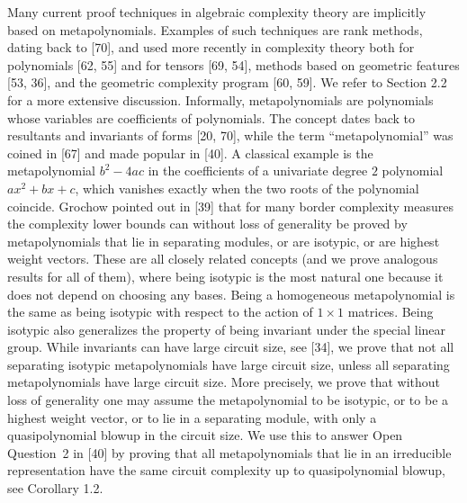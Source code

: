 Many current proof techniques in algebraic complexity theory are implicitly based on metapolynomials. Examples of such techniques are rank methods, dating back to [70], and used more recently in complexity theory both for polynomials [62, 55] and for tensors [69, 54], methods based on geometric features [53, 36], and the geometric complexity program [60, 59]. We refer to Section 2.2 for a more extensive discussion. Informally, metapolynomials are polynomials whose variables are coefficients of polynomials. The concept dates back to resultants and invariants of forms [20, 70], while the term “metapolynomial” was coined in [67] and made popular in [40]. A classical example is the metapolynomial $b^{2}-4ac$ in the coefficients of a univariate degree $2$ polynomial $ax^{2}+bx+c$, which vanishes exactly when the two roots of the polynomial coincide.
Grochow pointed out in [39] that for many border complexity measures the complexity lower bounds can without loss of generality be proved by metapolynomials that lie in separating modules, or are isotypic, or are highest weight vectors.
These are all closely related concepts (and we prove analogous results for all of them), where being isotypic is the most natural one because it does not depend on choosing any bases.
Being a homogeneous metapolynomial is the same as being isotypic with respect to the action of $1\times 1$ matrices.
Being isotypic also generalizes the property of being invariant under the special linear group.
While invariants can have large circuit size, see [34],
we prove that not all separating isotypic metapolynomials have large circuit size, unless all separating metapolynomials have large circuit size.
More precisely, we prove that without loss of generality one may assume the metapolynomial to be isotypic, or to be a highest weight vector, or to lie in a separating module, with only a quasipolynomial blowup in the circuit size.
We use this to answer Open Question 2 in [40] by proving that all metapolynomials that lie in an irreducible representation have the same circuit complexity up to quasipolynomial blowup, see Corollary 1.2.





